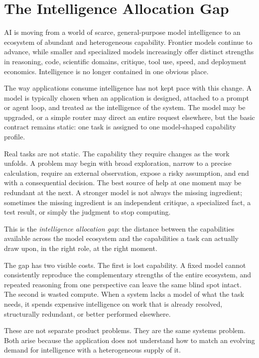 \section{The Intelligence Allocation Gap}

AI is moving from a world of scarce, general-purpose model intelligence to an
ecosystem of abundant and heterogeneous capability. Frontier models continue
to advance, while smaller and specialized models increasingly offer distinct
strengths in reasoning, code, scientific domains, critique, tool use, speed,
and deployment economics. Intelligence is no longer contained in one obvious
place.

The way applications consume intelligence has not kept pace with this change.
A model is typically chosen when an application is designed, attached to a
prompt or agent loop, and treated as the intelligence of the system. The model
may be upgraded, or a simple router may direct an entire request elsewhere,
but the basic contract remains static: one task is assigned to one model-shaped
capability profile.

Real tasks are not static. The capability they require changes as the work
unfolds. A problem may begin with broad exploration, narrow to a precise
calculation, require an external observation, expose a risky assumption, and
end with a consequential decision. The best source of help at one moment may
be redundant at the next. A stronger model is not always the missing
ingredient; sometimes the missing ingredient is an independent critique, a
specialized fact, a test result, or simply the judgment to stop computing.

This is the \emph{intelligence allocation gap}: the distance between the
capabilities available across the model ecosystem and the capabilities a task
can actually draw upon, in the right role, at the right moment.

The gap has two visible costs. The first is lost capability. A fixed model
cannot consistently reproduce the complementary strengths of the entire
ecosystem, and repeated reasoning from one perspective can leave the same blind
spot intact. The second is wasted compute. When a system lacks a model of what
the task needs, it spends expensive intelligence on work that is already
resolved, structurally redundant, or better performed elsewhere.

These are not separate product problems. They are the same systems problem.
Both arise because the application does not understand how to match an evolving
demand for intelligence with a heterogeneous supply of it.

